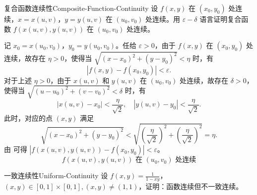 \begin{problem}{复合函数连续性}{Composite-Function-Continuity}
    设 $f(x,y)$ 在 $(x_0, y_0)$ 处连续，$x = x(u,v)$，$y = y(u,v)$ 在 $(u_0, v_0)$ 处连续。用 $\varepsilon - \delta$ 语言证明复合函数 $f(x(u,v), y(u,v))$ 在 $(u_0, v_0)$ 处连续。
\end{problem}

\begin{myproof}
    记 $x_0 = x(u_0, v_0)$，$y_0 = y(u_0, v_0)$。任给 $\varepsilon > 0$，由于 $f(x,y)$ 在 $(x_0, y_0)$ 处连续，故存在 $\eta > 0$，使得当 $\sqrt{(x-x_0)^2 + (y-y_0)^2} < \eta$ 时，有
    \begin{equation}
        |f(x,y) - f(x_0, y_0)| < \varepsilon.
        \label{eq:f-continuity}
    \end{equation}
    对于上述 $\eta > 0$，由于 $x(u,v)$ 和 $y(u,v)$ 在 $(u_0, v_0)$ 处连续，故存在 $\delta > 0$，使得当 $\sqrt{(u-u_0)^2 + (v-v_0)^2} < \delta$ 时，有
    \begin{equation}
        |x(u,v) - x_0| < \frac{\eta}{\sqrt{2}}, \quad |y(u,v) - y_0| < \frac{\eta}{\sqrt{2}}.
        \label{eq:xy-continuity}
    \end{equation}
    此时，对应的点 $(x,y)$ 满足
    \begin{equation}
        \sqrt{(x-x_0)^2 + (y-y_0)^2} < \sqrt{\left( \frac{\eta}{\sqrt{2}} \right)^2 + \left( \frac{\eta}{\sqrt{2}} \right)^2} = \eta.
    \end{equation}
    由  可得 $|f(x(u,v), y(u,v)) - f(x_0, y_0)| < \varepsilon$。
    \begin{equation}
        \boxed{f(x(u,v), y(u,v)) \text{ 在 } (u_0, v_0) \text{ 处连续}}
    \end{equation}
\end{myproof}

\begin{problem}{一致连续性}{Uniform-Continuity}
    设 $f(x,y) = \frac{1}{1-xy}$，$(x,y) \in [0,1] \times [0,1], (x,y) \neq (1,1)$，证明：函数连续但不一致连续。
\end{problem}

